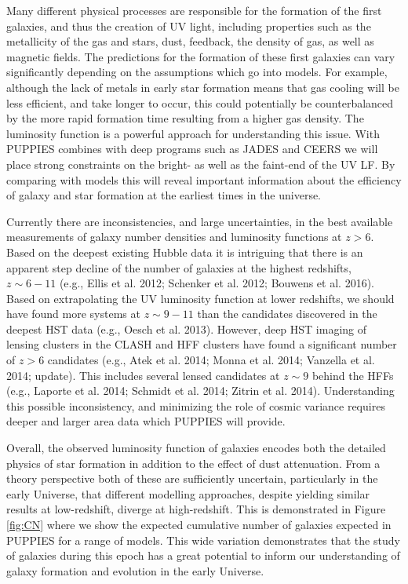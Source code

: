 \documentclass[12pt]{article}
\begin{document}
Many different physical processes are responsible for the formation of the first galaxies, and thus the creation of UV light, including properties such as the metallicity of the gas and stars,  dust, feedback, the density of gas, as well as magnetic fields.    The predictions for the formation of these first galaxies can vary significantly depending on the  assumptions which go into models.  For example, although the lack of metals in early star formation means that gas cooling will be less efficient, and take longer to occur, this could potentially be counterbalanced by the more rapid formation time resulting from a higher gas density.  The luminosity function is a powerful approach for understanding this issue. With PUPPIES combines with deep programs such as JADES and CEERS we will place strong constraints on the bright- as well as the faint-end of the UV LF.   By comparing with models this will reveal important information about the efficiency of galaxy and star formation at the earliest times in the universe.
 
Currently there are inconsistencies, and large uncertainties, in the best available measurements of galaxy number densities and luminosity functions at $z > 6$.  Based on the deepest existing Hubble data it is intriguing that there is an apparent step decline of the number of galaxies at the highest redshifts, $z \sim 6-11$ (e.g., Ellis et al. 2012; Schenker et al. 2012; Bouwens et al. 2016). Based on extrapolating the UV luminosity function at lower redshifts, we should have found more systems at $z \sim 9-11$ than the candidates discovered in the deepest HST data (e.g., Oesch et al. 2013).  However, deep HST imaging of lensing clusters in the CLASH and HFF clusters have found a significant number of $z>6$ candidates (e.g., Atek et al. 2014; Monna et al. 2014; Vanzella et al. 2014; update).  This includes several lensed candidates at $z\sim 9$ behind the HFFs (e.g., Laporte et al. 2014; Schmidt et al. 2014; Zitrin et al. 2014).   Understanding this possible inconsistency, and minimizing the role of cosmic variance requires deeper and larger area data which PUPPIES will provide.

Overall, the observed luminosity function of galaxies encodes both the  detailed physics of star formation in addition to the effect of dust attenuation. From a theory perspective both of these are sufficiently uncertain, particularly in the early Universe, that different modelling approaches, despite yielding similar results at low-redshift, diverge at high-redshift. This is demonstrated in Figure \ref{fig:CN} where we show the expected cumulative number of galaxies expected in PUPPIES for a range of models. This wide variation demonstrates that the study of galaxies during this epoch has a great potential to inform our understanding of galaxy formation and evolution in the early Universe.
\end{document}
